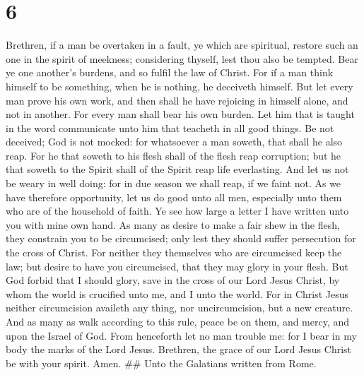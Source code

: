 \hypertarget{section-5}{%
\section{6}\label{section-5}}

 Brethren, if a man be overtaken in a fault, ye which are
spiritual, restore such an one in the spirit of meekness; considering
thyself, lest thou also be tempted.  Bear ye one another's
burdens, and so fulfil the law of Christ.  For if a man
think himself to be something, when he is nothing, he deceiveth himself.
 But let every man prove his own work, and then shall he
have rejoicing in himself alone, and not in another.  For
every man shall bear his own burden.  Let him that is
taught in the word communicate unto him that teacheth in all good
things.  Be not deceived; God is not mocked: for
whatsoever a man soweth, that shall he also reap.  For he
that soweth to his flesh shall of the flesh reap corruption; but he that
soweth to the Spirit shall of the Spirit reap life everlasting.
 And let us not be weary in well doing: for in due season
we shall reap, if we faint not.  As we have therefore
opportunity, let us do good unto all men, especially unto them who are
of the household of faith.  Ye see how large a letter I
have written unto you with mine own hand.  As many as
desire to make a fair shew in the flesh, they constrain you to be
circumcised; only lest they should suffer persecution for the cross of
Christ.  For neither they themselves who are circumcised
keep the law; but desire to have you circumcised, that they may glory in
your flesh.  But God forbid that I should glory, save in
the cross of our Lord Jesus Christ, by whom the world is crucified unto
me, and I unto the world.  For in Christ Jesus neither
circumcision availeth any thing, nor uncircumcision, but a new creature.
 And as many as walk according to this rule, peace be on
them, and mercy, and upon the Israel of God.  From
henceforth let no man trouble me: for I bear in my body the marks of the
Lord Jesus.  Brethren, the grace of our Lord Jesus Christ
be with your spirit. Amen. \#\# Unto the Galatians written from Rome.
